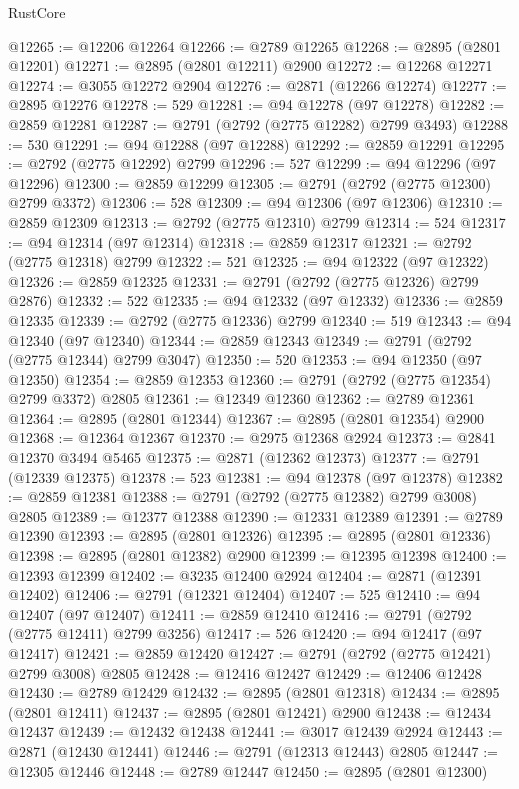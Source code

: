 \begin{lexlean}{RustCore}
\begin{coremodule}
@12265 := @12206 @12264
@12266 := @2789 @12265
@12268 := @2895 (@2801 @12201)
@12271 := @2895 (@2801 @12211) @2900
@12272 := @12268 @12271
@12274 := @3055 @12272 @2904
@12276 := @2871 (@12266 @12274)
@12277 := @2895 @12276
@12278 := 529
@12281 := @94 @12278 (@97 @12278)
@12282 := @2859 @12281
@12287 := @2791 (@2792 (@2775 @12282) @2799 @3493)
@12288 := 530
@12291 := @94 @12288 (@97 @12288)
@12292 := @2859 @12291
@12295 := @2792 (@2775 @12292) @2799
@12296 := 527
@12299 := @94 @12296 (@97 @12296)
@12300 := @2859 @12299
@12305 := @2791 (@2792 (@2775 @12300) @2799 @3372)
@12306 := 528
@12309 := @94 @12306 (@97 @12306)
@12310 := @2859 @12309
@12313 := @2792 (@2775 @12310) @2799
@12314 := 524
@12317 := @94 @12314 (@97 @12314)
@12318 := @2859 @12317
@12321 := @2792 (@2775 @12318) @2799
@12322 := 521
@12325 := @94 @12322 (@97 @12322)
@12326 := @2859 @12325
@12331 := @2791 (@2792 (@2775 @12326) @2799 @2876)
@12332 := 522
@12335 := @94 @12332 (@97 @12332)
@12336 := @2859 @12335
@12339 := @2792 (@2775 @12336) @2799
@12340 := 519
@12343 := @94 @12340 (@97 @12340)
@12344 := @2859 @12343
@12349 := @2791 (@2792 (@2775 @12344) @2799 @3047)
@12350 := 520
@12353 := @94 @12350 (@97 @12350)
@12354 := @2859 @12353
@12360 := @2791 (@2792 (@2775 @12354) @2799 @3372) @2805
@12361 := @12349 @12360
@12362 := @2789 @12361
@12364 := @2895 (@2801 @12344)
@12367 := @2895 (@2801 @12354) @2900
@12368 := @12364 @12367
@12370 := @2975 @12368 @2924
@12373 := @2841 @12370 @3494 @5465
@12375 := @2871 (@12362 @12373)
@12377 := @2791 (@12339 @12375)
@12378 := 523
@12381 := @94 @12378 (@97 @12378)
@12382 := @2859 @12381
@12388 := @2791 (@2792 (@2775 @12382) @2799 @3008) @2805
@12389 := @12377 @12388
@12390 := @12331 @12389
@12391 := @2789 @12390
@12393 := @2895 (@2801 @12326)
@12395 := @2895 (@2801 @12336)
@12398 := @2895 (@2801 @12382) @2900
@12399 := @12395 @12398
@12400 := @12393 @12399
@12402 := @3235 @12400 @2924
@12404 := @2871 (@12391 @12402)
@12406 := @2791 (@12321 @12404)
@12407 := 525
@12410 := @94 @12407 (@97 @12407)
@12411 := @2859 @12410
@12416 := @2791 (@2792 (@2775 @12411) @2799 @3256)
@12417 := 526
@12420 := @94 @12417 (@97 @12417)
@12421 := @2859 @12420
@12427 := @2791 (@2792 (@2775 @12421) @2799 @3008) @2805
@12428 := @12416 @12427
@12429 := @12406 @12428
@12430 := @2789 @12429
@12432 := @2895 (@2801 @12318)
@12434 := @2895 (@2801 @12411)
@12437 := @2895 (@2801 @12421) @2900
@12438 := @12434 @12437
@12439 := @12432 @12438
@12441 := @3017 @12439 @2924
@12443 := @2871 (@12430 @12441)
@12446 := @2791 (@12313 @12443) @2805
@12447 := @12305 @12446
@12448 := @2789 @12447
@12450 := @2895 (@2801 @12300)

\end{coremodule}
\end{lexlean}
